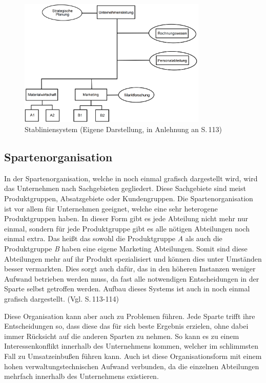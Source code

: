         \begin{figure}[ht]
            \centering
            \includegraphics[width = 0.8\textwidth]{Eigene Darstellungen/Stablinienstruktur.PNG}
            \caption{Stabliniensystem (Eigene Darstellung, in Anlehnung an \cite{Woehe2020} S.\,113)} \label{Stablinie}
        \end{figure}

    \subsection{Spartenorganisation} \label{Spartenorganisation}
        In der Spartenorganisation, welche in  noch einmal grafisch dargestellt wird, wird das Unternehmen 
        nach Sachgebieten gegliedert. Diese Sachgebiete sind meist Produktgruppen, Absatzgebiete oder Kundengruppen. Die
        Spartenorganisation ist vor allem für Unternehmen geeignet, welche eine sehr heterogene Produktgruppen haben. In 
        dieser Form gibt es jede Abteilung nicht mehr nur einmal, sondern für jede Produktgruppe gibt es alle nötigen 
        Abteilungen noch einmal extra. Das heißt das sowohl die Produktgruppe \emph{A} als auch die Produktgruppe 
        \emph{B} haben eine eigene Marketing Abteilungen. Somit sind diese Abteilungen mehr auf ihr Produkt 
        spezialisiert und können dies unter Umständen besser vermarkten. Dies sorgt auch dafür, das in den höheren 
        Instanzen weniger Aufwand betrieben werden muss, da fast alle notwendigen Entscheidungen in der Sparte selbst 
        getroffen werden. Aufbau dieses Systems ist auch in  noch einmal grafisch dargestellt. 
        (Vgl. \cite{Woehe2020} S.\,113-114)

        Diese Organisation kann aber auch zu Problemen führen. Jede Sparte trifft ihre Entscheidungen so, dass diese das 
        für sich beste Ergebnis erzielen, ohne dabei immer Rücksicht auf die anderen Sparten zu nehmen. So kann es zu 
        einem Interessenkonflikt innerhalb des Unternehmens kommen, welcher im schlimmsten Fall zu Umsatzeinbußen führen
        kann. Auch ist diese Organisationsform mit einem hohen verwaltungstechnischen Aufwand verbunden, da die 
        einzelnen Abteilungen mehrfach innerhalb des Unternehmens existieren.


